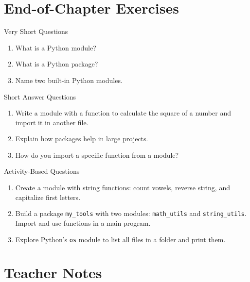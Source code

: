 \section{End-of-Chapter Exercises}

\begin{exercise}{Very Short Questions}
\begin{enumerate}
    \item What is a Python module?  
    \item What is a Python package?  
    \item Name two built-in Python modules.  
\end{enumerate}
\end{exercise}

\begin{exercise}{Short Answer Questions}
\begin{enumerate}
    \item Write a module with a function to calculate the square of a number and import it in another file.  
    \item Explain how packages help in large projects.  
    \item How do you import a specific function from a module?  
\end{enumerate}
\end{exercise}

\begin{exercise}{Activity-Based Questions}
\begin{enumerate}
    \item Create a module with string functions: count vowels, reverse string, and capitalize first letters.  
    \item Build a package \texttt{my\_tools} with two modules: \texttt{math\_utils} and \texttt{string\_utils}. Import and use functions in a main program.  
    \item Explore Python’s \texttt{os} module to list all files in a folder and print them.  
\end{enumerate}
\end{exercise}

\section{Teacher Notes}

